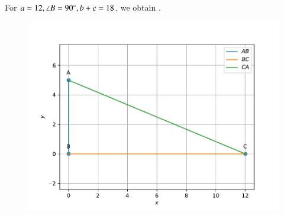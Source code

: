 For $a = 12, \angle B = 90\degree, b+c = 18$, we obtain 
		.
	\begin{figure}[!h]
		\centering
 \includegraphics[width=\columnwidth]{chapters/9/11/2/5/figs/vector.pdf}
		\caption{}
		\label{fig:9/11/2/5}
  	\end{figure}
